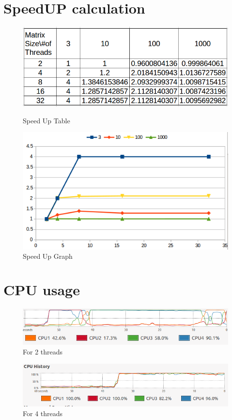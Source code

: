 \documentclass{sem5}
\begin{document}
\section{SpeedUP calculation}
\begin{figure}[!htp]
\centering
\includegraphics[scale=.4]{su.png}
\caption{Speed Up Table}
\includegraphics[scale=.4]{spu.png}
\caption{Speed Up Graph}
\end{figure}


\section{CPU usage}
\begin{figure}[!htp]
\centering
\includegraphics[scale=.4]{thr2.png}
\caption{For 2 threads}
\end{figure}
\begin{figure}[!htp]
\centering
\includegraphics[scale=.4]{thr_4.png}
\caption{For 4 threads}
\end{figure}
\end{document}

